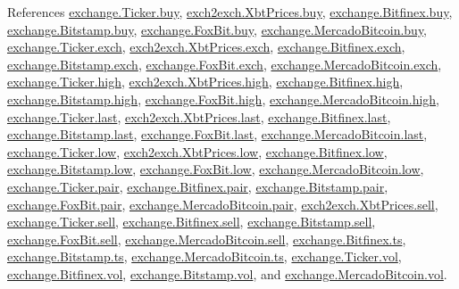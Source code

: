 References \hyperlink{exchange_8py_source_l00058}{exchange.\+Ticker.\+buy}, \hyperlink{exch2exch_8py_source_l00059}{exch2exch.\+Xbt\+Prices.\+buy}, \hyperlink{exchange_8py_source_l00331}{exchange.\+Bitfinex.\+buy}, \hyperlink{exchange_8py_source_l00400}{exchange.\+Bitstamp.\+buy}, \hyperlink{exchange_8py_source_l00472}{exchange.\+Fox\+Bit.\+buy}, \hyperlink{exchange_8py_source_l00534}{exchange.\+Mercado\+Bitcoin.\+buy}, \hyperlink{exchange_8py_source_l00055}{exchange.\+Ticker.\+exch}, \hyperlink{exch2exch_8py_source_l00064}{exch2exch.\+Xbt\+Prices.\+exch}, \hyperlink{exchange_8py_source_l00325}{exchange.\+Bitfinex.\+exch}, \hyperlink{exchange_8py_source_l00397}{exchange.\+Bitstamp.\+exch}, \hyperlink{exchange_8py_source_l00465}{exchange.\+Fox\+Bit.\+exch}, \hyperlink{exchange_8py_source_l00531}{exchange.\+Mercado\+Bitcoin.\+exch}, \hyperlink{exchange_8py_source_l00060}{exchange.\+Ticker.\+high}, \hyperlink{exch2exch_8py_source_l00061}{exch2exch.\+Xbt\+Prices.\+high}, \hyperlink{exchange_8py_source_l00333}{exchange.\+Bitfinex.\+high}, \hyperlink{exchange_8py_source_l00402}{exchange.\+Bitstamp.\+high}, \hyperlink{exchange_8py_source_l00474}{exchange.\+Fox\+Bit.\+high}, \hyperlink{exchange_8py_source_l00536}{exchange.\+Mercado\+Bitcoin.\+high}, \hyperlink{exchange_8py_source_l00062}{exchange.\+Ticker.\+last}, \hyperlink{exch2exch_8py_source_l00063}{exch2exch.\+Xbt\+Prices.\+last}, \hyperlink{exchange_8py_source_l00335}{exchange.\+Bitfinex.\+last}, \hyperlink{exchange_8py_source_l00404}{exchange.\+Bitstamp.\+last}, \hyperlink{exchange_8py_source_l00476}{exchange.\+Fox\+Bit.\+last}, \hyperlink{exchange_8py_source_l00538}{exchange.\+Mercado\+Bitcoin.\+last}, \hyperlink{exchange_8py_source_l00061}{exchange.\+Ticker.\+low}, \hyperlink{exch2exch_8py_source_l00062}{exch2exch.\+Xbt\+Prices.\+low}, \hyperlink{exchange_8py_source_l00334}{exchange.\+Bitfinex.\+low}, \hyperlink{exchange_8py_source_l00403}{exchange.\+Bitstamp.\+low}, \hyperlink{exchange_8py_source_l00475}{exchange.\+Fox\+Bit.\+low}, \hyperlink{exchange_8py_source_l00537}{exchange.\+Mercado\+Bitcoin.\+low}, \hyperlink{exchange_8py_source_l00056}{exchange.\+Ticker.\+pair}, \hyperlink{exchange_8py_source_l00326}{exchange.\+Bitfinex.\+pair}, \hyperlink{exchange_8py_source_l00398}{exchange.\+Bitstamp.\+pair}, \hyperlink{exchange_8py_source_l00466}{exchange.\+Fox\+Bit.\+pair}, \hyperlink{exchange_8py_source_l00532}{exchange.\+Mercado\+Bitcoin.\+pair}, \hyperlink{exch2exch_8py_source_l00058}{exch2exch.\+Xbt\+Prices.\+sell}, \hyperlink{exchange_8py_source_l00059}{exchange.\+Ticker.\+sell}, \hyperlink{exchange_8py_source_l00332}{exchange.\+Bitfinex.\+sell}, \hyperlink{exchange_8py_source_l00401}{exchange.\+Bitstamp.\+sell}, \hyperlink{exchange_8py_source_l00473}{exchange.\+Fox\+Bit.\+sell}, \hyperlink{exchange_8py_source_l00535}{exchange.\+Mercado\+Bitcoin.\+sell}, \hyperlink{exchange_8py_source_l00329}{exchange.\+Bitfinex.\+ts}, \hyperlink{exchange_8py_source_l00399}{exchange.\+Bitstamp.\+ts}, \hyperlink{exchange_8py_source_l00533}{exchange.\+Mercado\+Bitcoin.\+ts}, \hyperlink{exchange_8py_source_l00063}{exchange.\+Ticker.\+vol}, \hyperlink{exchange_8py_source_l00336}{exchange.\+Bitfinex.\+vol}, \hyperlink{exchange_8py_source_l00405}{exchange.\+Bitstamp.\+vol}, and \hyperlink{exchange_8py_source_l00539}{exchange.\+Mercado\+Bitcoin.\+vol}.


